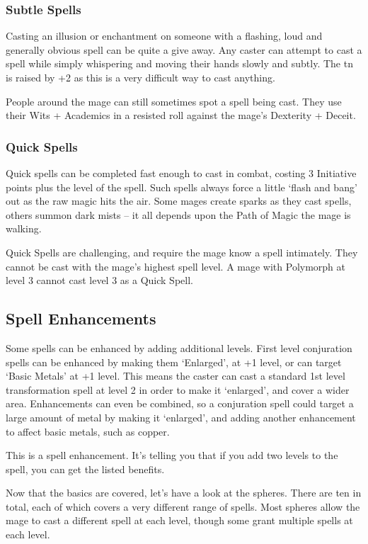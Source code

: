 \documentclass[titlepage,a4paper,openany]{book}
\begin{document}
\begin{multicols}{2}
\subsubsection{Subtle Spells}

Casting an illusion or enchantment on someone with a flashing, loud and generally obvious spell can be quite a give away. Any caster can attempt to cast a spell while simply whispering and moving their hands slowly and subtly.  The \gls{tn} is raised by +2 as this is a very difficult way to cast anything.

People around the mage can still sometimes spot a spell being cast. They use their Wits + Academics in a resisted roll against the mage's Dexterity + Deceit.

\subsubsection{Quick Spells}

Quick spells can be completed fast enough to cast in combat, costing 3 Initiative points plus the level of the spell.
Such spells always force a little `flash and bang' out as the raw magic hits the air.
Some mages create sparks as they cast spells, others summon dark mists -- it all depends upon the Path of Magic the mage is walking.

Quick Spells are challenging, and require the mage know a spell intimately.  They cannot be cast with the mage's highest spell level.  A mage with Polymorph at level 3 cannot cast level 3 as a Quick Spell.

\subsection{Spell Enhancements}

Some spells can be enhanced by adding additional levels.  First level conjuration spells can be enhanced by making them `Enlarged', at +1 level, or can target `Basic Metals' at +1 level.  This means the caster can cast a standard 1st level transformation spell at level 2 in order to make it `enlarged', and cover a wider area.  Enhancements can even be combined, so a conjuration spell could target a large amount of metal by making it `enlarged', and adding another enhancement to affect basic metals, such as copper.


This is a spell enhancement.  It's telling you that if you add two levels to the spell, you can get the listed benefits.

\vspace{.3in} 

\noindent Now that the basics are covered, let's have a look at the \glspl{sphere}. There are ten in total, each of which covers a very different range of spells. Most \glspl{sphere} allow the mage to cast a different spell at each level, though some grant multiple spells at each level.

\end{multicols}
\end{document}
